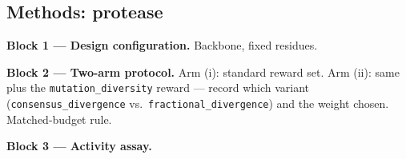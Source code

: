 \subsection{Methods: protease}
\label{sec:met:protease}

\begin{planlist}
  \item \textbf{Block 1 --- Design configuration.} Backbone, fixed residues.
  \item \textbf{Block 2 --- Two-arm protocol.} Arm (i): standard reward set.
        Arm (ii): same plus the \texttt{mutation\_diversity} reward --- record
        which variant (\texttt{consensus\_divergence} vs.\
        \texttt{fractional\_divergence}) and the weight chosen. Matched-budget
        rule.
  \item \textbf{Block 3 --- Activity assay.}
\end{planlist}
